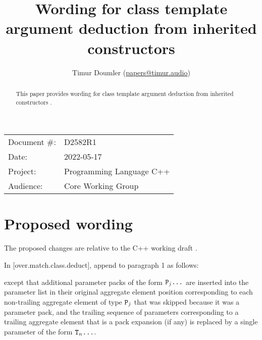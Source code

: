 

\newcommand{\forceindent}{\parindent=1em\indent\parindent=0pt\relax} %



\title{Wording for class template argument deduction from inherited constructors}
\author{
  Timur Doumler \small(\href{mailto:papers@timur.audio}{papers@timur.audio})
}
\date{}
\maketitle

\begin{tabular}{ll}
Document \#: & D2582R1 \\
Date: & 2022-05-17\\
Project: & Programming Language C++ \\
Audience: & Core Working Group
\end{tabular}


\begin{abstract}
This paper provides wording for class template argument deduction from inherited constructors \cite{P1021R6}.
\end{abstract}

\section{Proposed wording}

The proposed changes are relative to the C++ working draft \cite{N4910}. 

In [over.match.class.deduct], append to paragraph 1 as follows:

\begin{adjustwidth}{0.5cm}{0.5cm}
except that additional parameter packs of the form $\texttt{P}_j \texttt{...}$
are inserted into the parameter list in their original aggregate element position corresponding to each non-trailing aggregate element of type $\texttt{P}_j$
that was skipped because it was a parameter pack, and
the trailing sequence of parameters corresponding
to a trailing aggregate element that is a pack expansion (if any)
is replaced by a single parameter of the form $\texttt{T}_n \texttt{...}$.

\end{adjustwidth}

